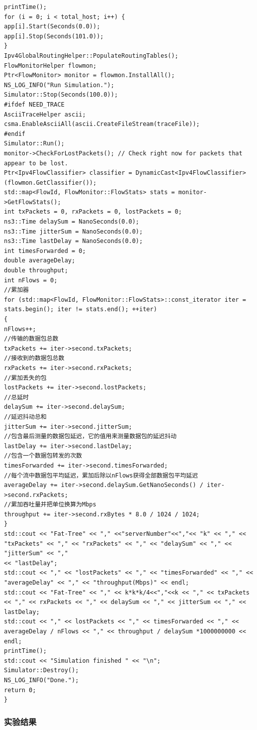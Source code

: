 \documentclass[lang=cn,11pt,a4paper,cite=authoryear]{elegantpaper}
\begin{document}
\begin{lstlisting}
printTime();
for (i = 0; i < total_host; i++) {
app[i].Start(Seconds(0.0));
app[i].Stop(Seconds(101.0));
}
Ipv4GlobalRoutingHelper::PopulateRoutingTables();
FlowMonitorHelper flowmon;
Ptr<FlowMonitor> monitor = flowmon.InstallAll();
NS_LOG_INFO("Run Simulation.");
Simulator::Stop(Seconds(100.0));
#ifdef NEED_TRACE
AsciiTraceHelper ascii;
csma.EnableAsciiAll(ascii.CreateFileStream(traceFile));
#endif
Simulator::Run();
monitor->CheckForLostPackets(); // Check right now for packets that appear to be lost.
Ptr<Ipv4FlowClassifier> classifier = DynamicCast<Ipv4FlowClassifier>(flowmon.GetClassifier());
std::map<FlowId, FlowMonitor::FlowStats> stats = monitor->GetFlowStats();
int txPackets = 0, rxPackets = 0, lostPackets = 0;
ns3::Time delaySum = NanoSeconds(0.0);
ns3::Time jitterSum = NanoSeconds(0.0);
ns3::Time lastDelay = NanoSeconds(0.0);
int timesForwarded = 0;
double averageDelay;
double throughput;
int nFlows = 0;
//累加器
for (std::map<FlowId, FlowMonitor::FlowStats>::const_iterator iter = stats.begin(); iter != stats.end(); ++iter)
{
nFlows++;
//传输的数据包总数
txPackets += iter->second.txPackets;
//接收到的数据包总数
rxPackets += iter->second.rxPackets;
//累加丢失的包
lostPackets += iter->second.lostPackets;
//总延时
delaySum += iter->second.delaySum;
//延迟抖动总和
jitterSum += iter->second.jitterSum;
//包含最后测量的数据包延迟，它的值用来测量数据包的延迟抖动
lastDelay += iter->second.lastDelay;
//包含一个数据包转发的次数
timesForwarded += iter->second.timesForwarded;
//每个流中数据包平均延迟，累加后除以nFlows获得全部数据包平均延迟
averageDelay += iter->second.delaySum.GetNanoSeconds() / iter->second.rxPackets;
//累加吞吐量并把单位换算为Mbps
throughput += iter->second.rxBytes * 8.0 / 1024 / 1024;
}
std::cout << "Fat-Tree" << "," <<"serverNumber"<<","<< "k" << "," << "txPackets" << "," << "rxPackets" << "," << "delaySum" << "," << "jitterSum" << "," 
<< "lastDelay";
std::cout << "," << "lostPackets" << "," << "timesForwarded" << "," << "averageDelay" << "," << "throughput(Mbps)" << endl;
std::cout << "Fat-Tree" << "," << k*k*k/4<<","<<k << "," << txPackets << "," << rxPackets << "," << delaySum << "," << jitterSum << "," << lastDelay;
std::cout << "," << lostPackets << "," << timesForwarded << "," << averageDelay / nFlows << "," << throughput / delaySum *1000000000 << endl;
printTime();
std::cout << "Simulation finished " << "\n";
Simulator::Destroy();
NS_LOG_INFO("Done.");
return 0;
}

\end{lstlisting}

\subsubsection{实验结果}
\end{document}
